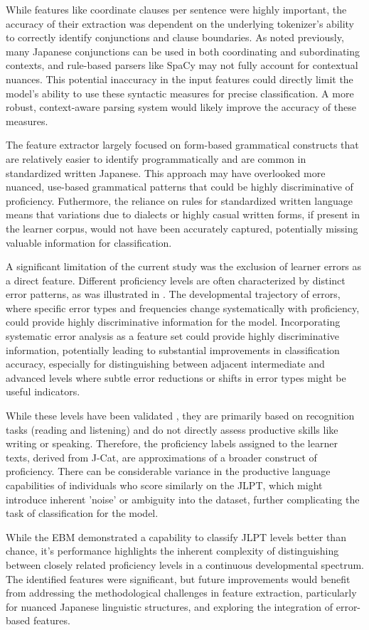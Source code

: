 While features like coordinate clauses per sentence were highly important, the accuracy of their extraction was
dependent on the underlying tokenizer's ability to correctly identify conjunctions and clause boundaries. As noted
previously, many Japanese conjunctions can be used in both coordinating and subordinating contexts, and rule-based
parsers like SpaCy may not fully account for contextual nuances. This potential inaccuracy in the input features
could directly limit the model's ability to use these syntactic measures for precise classification. A more robust,
context-aware parsing system would likely improve the accuracy of these measures.

The feature extractor largely focused on form-based grammatical constructs that are relatively easier to identify
programmatically and are common in standardized written Japanese. This approach may have overlooked more nuanced,
use-based grammatical patterns that could be highly discriminative of proficiency. Futhermore, the reliance on rules
for standardized written language means that variations due to dialects or highly casual written forms, if present
in the learner corpus, would not have been accurately captured, potentially missing valuable information for
classification.

A significant limitation of the current study was the exclusion of learner errors as a direct feature. Different
proficiency levels are often
characterized by distinct error patterns, as was illustrated in \citet{Hawkins_Buttery_2010}. The
developmental trajectory of errors, where specific error types and frequencies change systematically with
proficiency, could provide highly discriminative information for the model.
Incorporating
systematic error analysis as a
feature
set
could provide
highly discriminative information, potentially leading to substantial improvements in classification accuracy,
especially for distinguishing between adjacent intermediate and advanced levels where subtle error reductions or
shifts in error types might be useful indicators.

While these levels have been validated
\citet{jcat_interpretation_guide}, they
are primarily based on recognition tasks (reading and listening) and do not directly assess productive skills like
writing or speaking. Therefore, the proficiency labels assigned to the learner texts, derived from J-Cat, are approximations of a broader construct of proficiency. There can be considerable variance in the productive language capabilities of individuals who score similarly on the JLPT, which might introduce inherent 'noise' or ambiguity into the dataset, further complicating the task of classification for the model.

While the EBM demonstrated a capability to classify JLPT levels better than chance, it's performance highlights the
inherent
complexity of distinguishing between closely related proficiency levels in a continuous developmental spectrum. The
identified features were significant, but future improvements would benefit from addressing the methodological
challenges in feature extraction, particularly for nuanced Japanese linguistic structures, and exploring the
integration of error-based features.